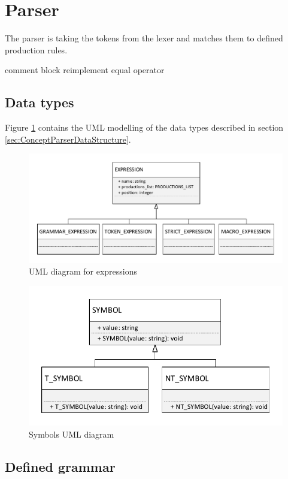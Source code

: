 \section{Parser}\label{sec:ImplementationParser}

The parser is taking the tokens from the lexer and matches them to defined production rules.




comment block reimplement equal operator

\subsection{Data types}\label{sec:ImplementationDataTypes}
Figure \ref{fig:ImplementationUMLExpressions} contains the UML modelling of the data types described in section \ref{sec:ConceptParserDataStructure}.
\begin{figure}[H]
\centering
\includegraphics[width=1\textwidth]{images/uml_data_types_expressions.pdf}
\caption{UML diagram for expressions}
\label{fig:ImplementationUMLExpressions}
\end{figure}


\begin{figure}[H]
\centering
\includegraphics[width=.7\textwidth]{images/Implementation_parser_symbol_uml.pdf}
\caption{Symbols UML diagram}
\label{fig:ImplementationUMLSymbols}
\end{figure}


\subsection{Defined grammar}\label{sec:ImplementationGrammar}

